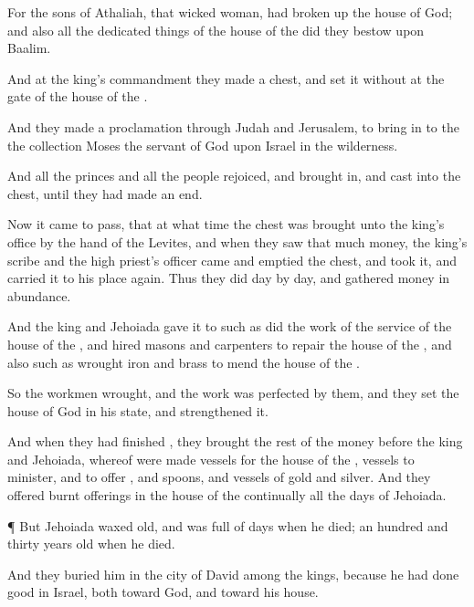 {For the
sons of
Athaliah, that
wicked woman, had broken
up the
house of
God; and also all the dedicated
things of the
house of the
{} did they
bestow upon
Baalim.

And at the
king’s
commandment they
made
a
chest, and
set it
without at the
gate of the
house of the
{}.

And they
made a
proclamation through
Judah and
Jerusalem, to bring
in to the
{} the
collection
{}
Moses the
servant of
God
{} upon
Israel in the
wilderness.

And all the
princes and all the
people
rejoiced, and brought
in, and
cast into the
chest, until they had made an
end.

Now it came to pass, that at what
time the
chest was
brought unto the
king’s
office by the
hand of the
Levites, and when they
saw that
{}
much
money, the
king’s
scribe and the
high
priest’s
officer
came and
emptied the
chest, and
took it, and
carried it to his
place
again. Thus they
did
day by
day, and
gathered
money in
abundance.

And the
king and
Jehoiada
gave it to such as
did the
work of the
service of the
house of the
{}, and
hired
masons and
carpenters to
repair the
house of the
{}, and also such as
wrought
iron and
brass to
mend the
house of the
{}.

So the
workmen
wrought, and the
work
was
perfected by
them, and they
set the
house of
God in his
state, and
strengthened it.

And when they had
finished
{}, they
brought the
rest of the
money
before the
king and
Jehoiada, whereof were
made
vessels for the
house of the
{},
{}
vessels to
minister, and to
offer
{}, and
spoons, and
vessels of
gold and
silver. And they
offered burnt
offerings in the
house of the
{}
continually all the
days of
Jehoiada.


\par }{\PP {}¶ But
Jehoiada waxed
old, and was
full of
days when he
died; an
hundred and
thirty
years
old
{} when he
died.

And they
buried him in the
city of
David among the
kings, because he had
done
good in
Israel, both toward
God, and toward his
house.

}

